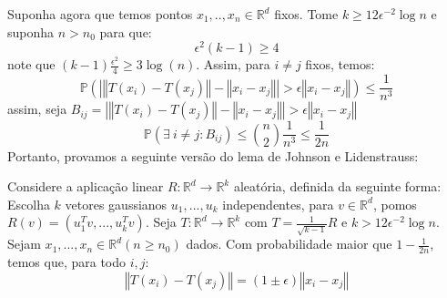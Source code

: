Suponha agora que temos pontos $x_1,..,x_n \in \mathbb{R}^d$ fixos. Tome $k \geq 12\epsilon^{-2}\log{n}$ e suponha $n>n_0$ para que:
\begin{equation*}
    \epsilon^2(k-1) \geq 4
\end{equation*}
note que $(k-1)\frac{\epsilon^2}{4} \geq 3\log(n)$. Assim, para $i \neq j$ fixos, temos:
\begin{equation*}
    \mathbb{P}(\left\vert \left\Vert T(x_i) - T(x_j) \right\Vert - \left\Vert x_i - x_j \right\Vert \right\vert > \epsilon\left\Vert x_i - x_j \right\Vert) \leq \frac{1}{n^3}
\end{equation*}
assim, seja $B_{ij} = \left\vert \left\Vert T(x_i) - T(x_j) \right\Vert - \left\Vert x_i - x_j \right\Vert \right\vert > \epsilon\left\Vert x_i - x_j \right\Vert$
\begin{equation*}
    \mathbb{P}(\exists\> i \neq j : B_{ij}) \leq \binom{n}{2}\frac{1}{n^3} \leq \frac{1}{2n}
\end{equation*}
Portanto, provamos a seguinte versão do lema de Johnson e Lidenstrauss:
\begin{teorema}
Considere a aplicação linear $R \colon \mathbb{R}^d \to \mathbb{R}^k$ aleatória, definida da seguinte forma: Escolha $k$ vetores gaussianos $u_1,...,u_k$ independentes, para $v \in \mathbb{R}^d$, pomos $R(v) = (u_1^Tv,...,u_k^Tv)$. Seja $T \colon \mathbb{R}^d \to \mathbb{R}^k$ com $T=\frac{1}{\sqrt{k-1}}R$ e $k > 12\epsilon^{-2}\log{n}$. Sejam $x_1,...,x_n \in \mathbb{R}^d (n \geq n_0)$ dados. Com probabilidade maior que $1 - \frac{1}{2n}$, temos que, para todo $i,j$:
\begin{equation*}
    \left\Vert T(x_i) - T(x_j) \right\Vert   = (1 \pm \epsilon)\left\Vert x_i - x_j \right\Vert
\end{equation*}
\end{teorema}


